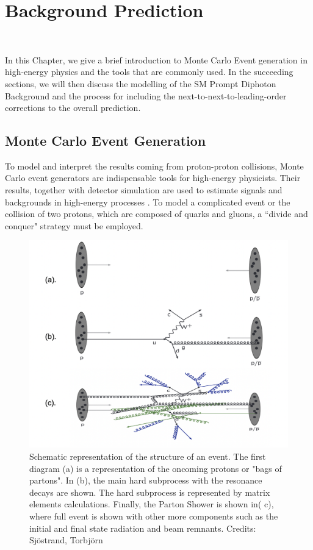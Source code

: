 \chapter{Background Prediction}~\label{ch:background}


In this Chapter, we give a brief introduction to Monte Carlo Event generation in high-energy physics and the tools that are commonly used. In the succeeding sections, we will then discuss the modelling of the SM Prompt Diphoton Background and the process for including the next-to-next-to-leading-order corrections to the overall prediction. 

\section{Monte Carlo Event Generation}

To model and interpret the results coming from proton-proton collisions, Monte Carlo event generators are indispensable tools for high-energy physicists. Their results, together with detector simulation are used to estimate signals and backgrounds in high-energy processes \cite{Tanabashi:2018oca}. To model a complicated event or the collision of two protons, which are composed of quarks and gluons, a ``divide and conquer" strategy must be employed.  

\begin{figure}[!htb]
	\centering
	\includegraphics[scale=0.5]{fig/eventStructure.png}
	\caption{Schematic representation of the structure of an event. The first diagram (a) is a representation of the oncoming protons or "bags of partons". In (b), the main hard subprocess with the resonance decays are shown. The hard subprocess is represented by matrix elements calculations. Finally, the Parton Shower is shown in( c), where full event is shown with other more components such as the initial and final state radiation and beam remnants. Credits: Sj{\"o}strand, Torbj{\"o}rn}
	\label{fig:EventStructure}
\end{figure}


